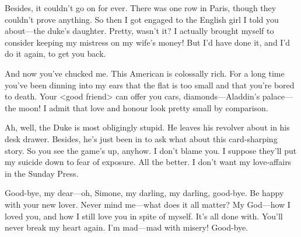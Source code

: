 Besides, it couldn't go on for ever. There was one row in Paris, though they couldn't prove anything. So then I got engaged to the English girl I told you about—the duke's daughter. Pretty, wasn't it? I actually brought myself to consider keeping my mistress on my wife's money! But I'd have done it, and I'd do it again, to get you back.

And now you've chucked me. This American is colossally rich. For a long time you've been dinning into my ears that the flat is too small and that you're bored to death. Your <good friend> can offer you cars, diamonds—Aladdin's palace—the moon! I admit that love and honour look pretty small by comparison.

Ah, well, the Duke is most obligingly stupid. He leaves his revolver about in his desk drawer. Besides, he's just been in to ask what about this card-sharping story. So you see the game's up, anyhow. I don't blame you. I suppose they'll put my suicide down to fear of exposure. All the better. I don't want my love-affairs in the Sunday Press.

Good-bye, my dear—oh, Simone, my darling, my darling, good-bye. Be happy with your new lover. Never mind me—what does it all matter? My God—how I loved you, and how I still love you in spite of myself. It's all done with. You'll never break my heart again. I'm mad—mad with misery! Good-bye.
